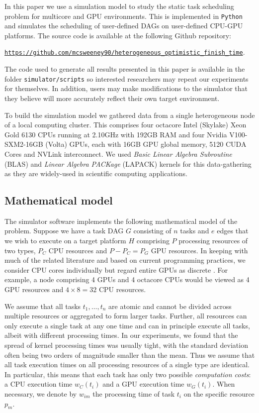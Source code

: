 \documentclass[runningheads]{llncs}
\begin{document}
In this paper we use a simulation model to study the static task scheduling problem for multicore and GPU environments. This is implemented in {\tt Python} and simulates the scheduling of user-defined DAGs on user-defined CPU-GPU platforms. The source code is available at the following Github repository: 
\begin{center}
	\href{https://github.com/mcsweeney90/heterogeneous_optimistic_finish_time}{{\tt \small https://github.com/mcsweeney90/heterogeneous\_optimistic\_finish\_time}}.
\end{center} 
The code used to generate all results presented in this paper is available in the folder {\tt simulator/scripts} so interested researchers may repeat our experiments for themselves. In addition, users may make modifications to the simulator that they believe will more accurately reflect their own target environment. 

To build the simulation model we gathered data from a single heterogeneous node of a local computing cluster. This comprises four octacore Intel (Skylake) Xeon Gold 6130 CPUs running at 2.10GHz with 192GB RAM and four Nvidia V100-SXM2-16GB (Volta) GPUs, each with 16GB GPU global memory, 5120 CUDA Cores and NVLink interconnect. We used {\em Basic Linear Algebra Subroutine} (BLAS) \cite{Dongarra:1990:SLB:77626.79170} and {\em Linear Algebra PACKage} (LAPACK) \cite{laug} kernels for this data-gathering as they are widely-used in scientific computing applications.

\subsection{Mathematical model}
\label{subsect.mathematical_model}

The simulator software implements the following mathematical model of the problem. Suppose we have a task DAG $G$ consisting of $n$ tasks and $e$ edges that we wish to execute on a target platform $H$ comprising $P$ processing resources of two types, $P_C$ CPU resources and $P - P_C = P_G$ GPU resources. In keeping with much of the related literature and based on current programming practices, we consider CPU cores individually but regard entire GPUs as discrete \cite{agullo2016}. For example, a node comprising 4 GPUs and 4 octacore CPUs would be viewed as 4 GPU resources and $4 \times 8 = 32$ CPU resources.   

We assume that all tasks $t_1, \dots, t_n$ are atomic and cannot be divided across multiple resources or aggregated to form larger tasks. Further, all resources can only execute a single task at any one time and can in principle execute all tasks, albeit with different processing times. In our experiments, we found that the spread of kernel processing times was usually tight, with the standard deviation often being two orders of magnitude smaller than the mean. Thus we assume that all task execution times on all processing resources of a single type are identical. In particular, this means that each task has only two possible {\em computation costs}: a CPU execution time $w_C(t_i)$ and a GPU execution time $w_G(t_i)$. When necessary, we denote by $w_{im}$ the processing time of task $t_i$ on the specific resource $p_m$.
\end{document}
